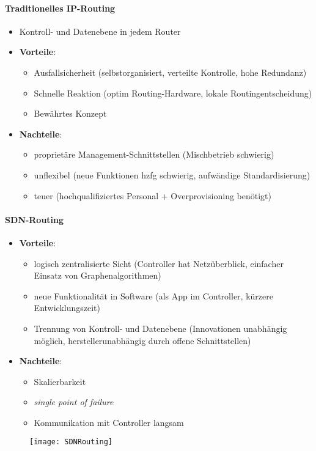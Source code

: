 \paragraph{Traditionelles IP-Routing}
\begin{itemize}
  \item Kontroll- und Datenebene in jedem Router
  \item \textbf{Vorteile}:
  \begin{itemize}
    \item Ausfallsicherheit (selbstorganisiert, verteilte Kontrolle, hohe Redundanz)
    \item Schnelle Reaktion (optim Routing-Hardware, lokale Routingentscheidung)
    \item Bewährtes Konzept
  \end{itemize}
  \item \textbf{Nachteile}:
  \begin{itemize}
    \item proprietäre Management-Schnittstellen (Mischbetrieb schwierig)
    \item unflexibel (neue Funktionen hzfg schwierig, aufwändige Standardisierung)
    \item teuer (hochqualifiziertes Personal + Overprovisioning benötigt)
  \end{itemize}
\end{itemize}

\paragraph{SDN-Routing}
\begin{itemize}
  \item \textbf{Vorteile}:
  \begin{itemize}
    \item logisch zentralisierte Sicht (Controller hat Netzüberblick, einfacher Einsatz von Graphenalgorithmen)
    \item neue Funktionalität in Software (als App im Controller, kürzere Entwicklungszeit)
    \item Trennung von Kontroll- und Datenebene (Innovationen unabhängig möglich, herstellerunabhängig durch offene Schnittstellen)
  \end{itemize}
  \item \textbf{Nachteile}:
  \begin{itemize}
    \item Skalierbarkeit
    \item \emph{single point of failure}
    \item Kommunikation mit Controller langsam
  \end{itemize}
\end{itemize}
\begin{figure}[H]\centering\label{SDNRouting}\texttt{[image: SDNRouting]}\end{figure}


